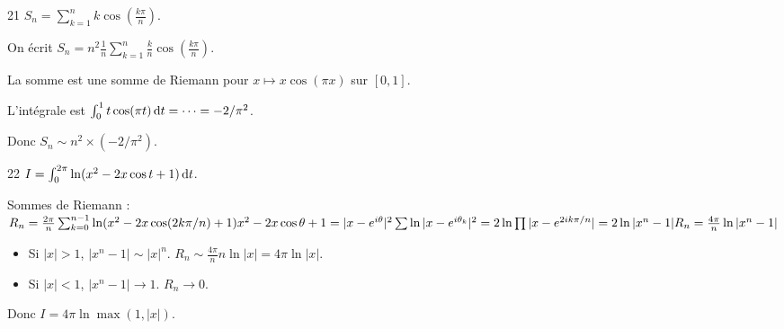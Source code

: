 \begin{correction}{21}
    $S_n = \sum_{k=1}^n k \cos(\frac{k\pi}{n})$.

    On écrit $S_n = n^2 \frac{1}{n} \sum_{k=1}^n \frac{k}{n} \cos(\frac{k\pi}{n})$.

    La somme est une somme de Riemann pour $x \mapsto x \cos(\pi x)$ sur $[0,1]$.

    L'intégrale est $\int_0^1 t \cos(\pi t) \,\mathrm{d}t = \dots = -2/\pi^2$.

    Donc $S_n \sim n^2 \times (-2/\pi^2)$.
\end{correction}

\begin{correction}{22}
    $I = \int_0^{2\pi} \ln(x^2 - 2x \cos t + 1) \,\mathrm{d}t$.

    Sommes de Riemann : 
    \begin{math}
        R_n = \frac{2\pi}{n} \sum_{k=0}^{n-1} \ln(x^2 - 2x \cos(2k\pi/n) + 1) \\
        x^2 - 2x \cos \theta + 1 = |x - e^{i\theta}|^2 \\
        \sum \ln |x-e^{i\theta_k}|^2 = 2 \ln \prod |x-e^{2ik\pi/n}| = 2 \ln |x^n-1| \\
        R_n = \frac{4\pi}{n} \ln |x^n-1|
    \end{math}
    \begin{itemize}
    \item 
        Si $|x| > 1$, $|x^n-1| \sim |x|^n$. $R_n \sim \frac{4\pi}{n} n \ln |x| = 4\pi \ln |x|$.
    \item
        Si $|x| < 1$, $|x^n-1| \to 1$. $R_n \to 0$.
    \end{itemize}
    Donc $I = 4\pi \ln \max(1, |x|)$.
\end{correction}
